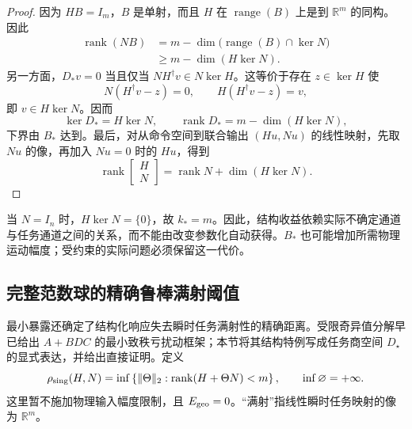 \documentclass[11pt,a4paper]{article}
\numberwithin{equation}{section}
\theoremstyle{definition}
\begin{document}
\begin{proof}
因为 $HB=I_m$，$B$ 是单射，而且 $H$ 在 $\operatorname{range}(B)$ 上是到 $\mathbb R^m$ 的同构。因此
\begin{align}
  \operatorname{rank}(NB)
  &=m-\dim\big(\operatorname{range}(B)\cap\ker N\big)\\
  &\ge m-\dim(H\ker N).
  \label{eq:cal-rank-lower}
\end{align}
另一方面，$D_*v=0$ 当且仅当 $NH^\dagger v\in N\ker H$。这等价于存在 $z\in\ker H$ 使
\begin{equation}
  N(H^\dagger v-z)=0,\qquad
  H(H^\dagger v-z)=v ,
\end{equation}
即 $v\in H\ker N$。因而
\begin{equation}
  \ker D_*=H\ker N,\qquad
  \operatorname{rank}D_*=m-\dim(H\ker N),
\end{equation}
下界由 $B_*$ 达到。最后，对从命令空间到联合输出 $(Hu,Nu)$ 的线性映射，先取 $Nu$ 的像，再加入 $Nu=0$ 时的 $Hu$，得到
\begin{equation}
  \operatorname{rank}
  \begin{bmatrix}H\\N\end{bmatrix}
  =\operatorname{rank}N+\dim(H\ker N).
\end{equation}
\end{proof}

当 $N=I_n$ 时，$H\ker N=\{0\}$，故 $k_*=m$。因此，结构收益依赖实际不确定通道与任务通道之间的关系，而不能由改变参数化自动获得。$B_*$ 也可能增加所需物理运动幅度；受约束的实际问题必须保留这一代价。

\subsection{完整范数球的精确鲁棒满射阈值}
\label{rev:sec:surjectivity}

最小暴露还确定了结构化响应失去瞬时任务满射性的精确距离。受限奇异值分解早已给出 $A+BDC$ 的最小致秩亏扰动框架\cite{demoorgolub1991}；本节将其结构特例写成任务商空间 $D_\star$ 的显式表达，并给出直接证明。定义
\begin{equation}
 \rho_{\rm sing}(H,N)
 =
 \inf\left\{
 \|\Theta\|_2:
 \operatorname{rank}(H+\Theta N)<m
 \right\},
 \qquad \inf\varnothing=+\infty .
 \label{rev:eq:sing-radius}
\end{equation}
这里暂不施加物理输入幅度限制，且 $E_{\rm geo}=0$。“满射”指线性瞬时任务映射的像为 $\mathbb R^m$。
\end{document}
